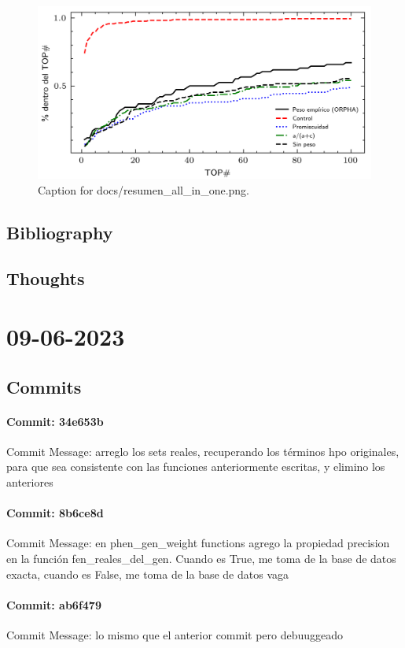 \documentclass{article}
\begin{document}
\begin{figure}[h] \centering \includegraphics{docs/resumen_all_in_one.png} \caption{Caption for docs/resumen_all_in_one.png.} \end{figure}
\subsection{Bibliography}
\subsection{Thoughts}

\section{09-06-2023}
\subsection{Commits}
\paragraph{Commit: 34e653b}
Commit Message: arreglo los sets reales, recuperando los términos hpo originales, para que sea consistente con las funciones anteriormente escritas, y elimino los anteriores

\paragraph{Commit: 8b6ce8d}
Commit Message: en phen_gen_weight functions agrego la propiedad precision en la función fen_reales_del_gen. Cuando es True, me toma de la base de datos exacta, cuando es False, me toma de la base de datos vaga

\paragraph{Commit: ab6f479}
Commit Message: lo mismo que el anterior commit pero debuuggeado
\end{document}
